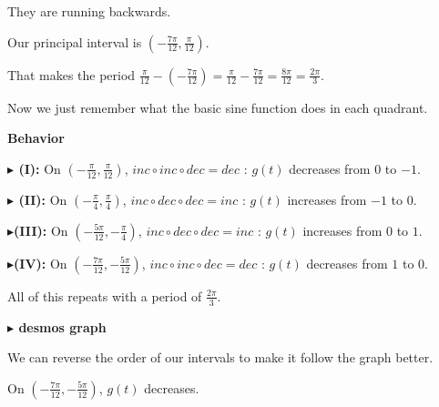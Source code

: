 \documentclass{ximera}
\begin{document}
\begin{example}
They are running backwards.






Our principal interval is $\left( -\frac{7\pi}{12}, \frac{\pi}{12} \right)$.

That makes the period $\frac{\pi}{12} - \left( -\frac{7\pi}{12} \right) = \frac{\pi}{12} -\frac{7\pi}{12} = \frac{8\pi}{12} = \frac{2\pi}{3}$.


Now we just remember what the basic sine function does in each quadrant. 







\textbf{\textcolor{blue!55!black}{Behavior}} 



\textbf{\textcolor{blue!55!black}{$\blacktriangleright$ (I):}} On $\left( -\frac{\pi}{12}, \frac{\pi}{12} \right)$, $inc \circ inc \circ dec = dec$ : $g(t)$ decreases from $0$ to $-1$.



\textbf{\textcolor{blue!55!black}{$\blacktriangleright$ (II):}} On $\left( -\frac{\pi}{4}, \frac{\pi}{4} \right)$, $inc \circ dec \circ dec = inc$ : $g(t)$ increases from $-1$ to $0$.



\textbf{\textcolor{blue!55!black}{$\blacktriangleright$(III):}} On $\left( -\frac{5\pi}{12}, -\frac{\pi}{4} \right)$, $inc \circ dec \circ dec = inc$ : $g(t)$ increases from $0$ to $1$.


\textbf{\textcolor{blue!55!black}{$\blacktriangleright$(IV):}} On $\left( -\frac{7\pi}{12}, -\frac{5\pi}{12} \right)$, $inc \circ inc \circ dec = dec$ : $g(t)$ decreases from $1$ to $0$.



All of this repeats with a period of $\frac{2\pi}{3}$.









\textbf{\textcolor{blue!55!black}{$\blacktriangleright$ desmos graph}} 
\begin{center}
\end{center}




We can reverse the order of our intervals to make it follow the graph better.

On $\left( -\frac{7\pi}{12}, -\frac{5\pi}{12} \right)$, $g(t)$ decreases.


\end{example}
\end{document}
